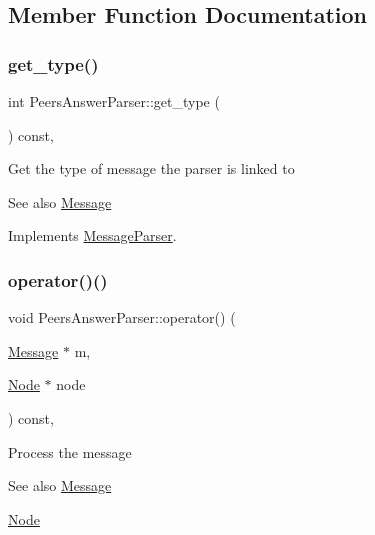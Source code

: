 \subsection{Member Function Documentation}
\mbox{\label{classPeersAnswerParser_a5f88ed07616ae3d17726f27b263645a6}} 
\subsubsection{\texorpdfstring{get\+\_\+type()}{get\_type()}}
{\footnotesize\ttfamily int Peers\+Answer\+Parser\+::get\+\_\+type (\begin{DoxyParamCaption}{ }\end{DoxyParamCaption}) const\hspace{0.3cm}{\ttfamily [final]}, {\ttfamily [virtual]}}

Get the type of message the parser is linked to \begin{DoxySeeAlso}{See also}
\mbox{\hyperlink{classMessage}{Message}} 
\end{DoxySeeAlso}


Implements \mbox{\hyperlink{classMessageParser_aa7c495d7b28a394e5752ca25ffff69d8}{Message\+Parser}}.

\mbox{\label{classPeersAnswerParser_ad566095c0594805919e7e4d14f8b076e}} 
\subsubsection{\texorpdfstring{operator()()}{operator()()}}
{\footnotesize\ttfamily void Peers\+Answer\+Parser\+::operator() (\begin{DoxyParamCaption}\item[{\mbox{\hyperlink{classMessage}{Message}} $\ast$}]{m,  }\item[{\mbox{\hyperlink{classNode}{Node}} $\ast$}]{node }\end{DoxyParamCaption}) const\hspace{0.3cm}{\ttfamily [final]}, {\ttfamily [virtual]}}

Process the message \begin{DoxySeeAlso}{See also}
\mbox{\hyperlink{classMessage}{Message}} 

\mbox{\hyperlink{classNode}{Node}}
\end{DoxySeeAlso}

